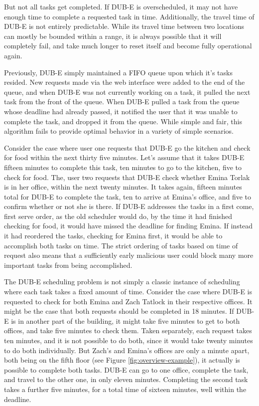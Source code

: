 \documentclass[11pt]{article}
\begin{document}
But not all tasks get completed.
If DUB-E is overscheduled,
it may not have enough time to complete a requested task in time.
Additionally, the travel time of DUB-E
is not entirely predictable.
While its travel time between two locations
can mostly be bounded within a range,
it is always possible that it will completely fail,
and take much longer to reset itself
and become fully operational again.

Previously, DUB-E simply maintained a FIFO queue
upon which it's tasks resided.
New requests made via the web interface
were added to the end of the queue,
and when DUB-E was not currently working on a task,
it pulled the next task from the front of the queue.
When DUB-E pulled a task from the queue
whose deadline had already passed,
it notified the user that it was unable to complete the task,
and dropped it from the queue.
While simple and fair,
this algorithm fails to provide
optimal behavior in a variety of simple scenarios.

Consider the case where user one
requests that DUB-E go the kitchen
and check for food
within the next thirty five minutes.
Let's assume that it takes DUB-E fifteen minutes
to complete this task,
ten minutes to go to the kitchen,
five to check for food.
The, user two requests that DUB-E
check whether Emina Torlak is in her office,
within the next twenty minutes.
It takes again, fifteen minutes total
for DUB-E to complete the task,
ten to arrive at Emina's office,
and five to confirm whether or not she is there.
If DUB-E addresses the tasks in a first come, first serve order,
as the old scheduler would do,
by the time it had finished checking for food,
it would have missed the deadline for finding Emina.
If instead it had reordered the tasks,
checking for Emina first,
it would be able to accomplish both tasks on time.
The strict ordering of tasks
based on time of request
also means that a sufficiently early malicious user
could block many more important tasks from being accomplished.

The DUB-E scheduling problem is not simply
a classic instance of scheduling
where each task takes a fixed amount of time.
Consider the case where DUB-E
is requested to check for both Emina and Zach Tatlock
in their respective offices.
It might be the case that both requests
should be completed in 18 minutes.
If DUB-E is in another part of the building,
it might take five minutes to get to both offices,
and take five minutes to check them.
Taken separately, each request takes ten minutes,
and it is not possible to do both,
since it would take twenty minutes to do both individually.
But Zach's and Emina's offices are only a minute apart,
both being on the fifth floor (see Figure \ref{fig:overview-example}),
it actually is possible to complete both tasks.
DUB-E can go to one office, complete the task,
and travel to the other one,
in only eleven minutes.
Completing the second task takes a further five minutes,
for a total time of sixteen minutes,
well within the deadline.
\end{document}
